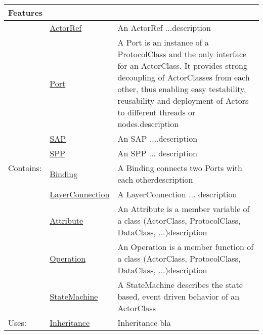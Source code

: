 			
			\vspace{\baselineskip}
			\begingroup
			\renewcommand{\arraystretch}{1.8} %
			\parbox{\textwidth}{
			\begin{longtable}{l l p{}}
				\multicolumn{2}{l}{\textbf{\large Features}} & \\
				\hline
			\multirow{9}{*}{Contains:} & \tabitem \hyperlink{ref:ActorRef}{ActorRef}  & An ActorRef ...description\\
			& \tabitem \hyperlink{ref:Port}{Port}  & A Port is an instance of a ProtocolClass and the only interface for an ActorClass. It provides strong decoupling of ActorClasses from each other, thus enabling easy testability, reusability and deployment of Actors to different threads or nodes.description  \\
			& \tabitem \hyperlink{ref:SAP}{SAP}  & An SAP ....description  \\
			& \tabitem \hyperlink{ref:SPP}{SPP}  & An SPP ... description \\
			& \tabitem \hyperlink{ref:Binding}{Binding}  & A Binding connects two Ports with each otherdescription \\
			& \tabitem \hyperlink{ref:LayerConnection}{LayerConnection}  & A LayerConnection ... description  \\
			& \tabitem \hyperlink{ref:Attribute}{Attribute}  & An Attribute is a member variable of a class (ActorClass, ProtocolClass, DataClass, ...)description  \\
			& \tabitem \hyperlink{ref:Operation}{Operation}  & An Operation is a member function of a class (ActorClass, ProtocolClass, DataClass, ...)description  \\
			& \tabitem \hyperlink{ref:StateMachine}{StateMachine}  & A StateMachine describes the state based, event driven behavior of an ActorClass \\
			\hline
			Uses: & \tabitem \hyperlink{ref:Inheritance}{Inheritance}  & Inheritance bla\\
			\hline
			\end{longtable}	
			}
			\endgroup
			\vspace{\baselineskip}
			
